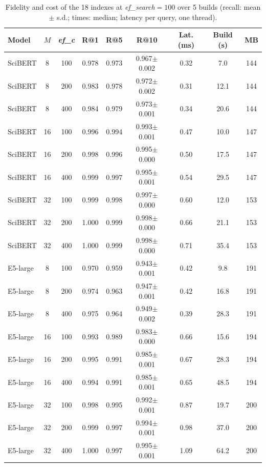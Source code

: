 \begin{table}[tbp]
\caption{Fidelity and cost of the 18 indexes at \textit{ef\_search}$=100$ over 5 builds (recall: mean $\pm$ s.d.; times: median; latency per query, one thread).}\label{tab:configs}
\centering
\small
\begin{tabular}{|l|c|c|c|c|c|c|c|c|}
\hline
\textbf{Model} & \textbf{$M$} & \textbf{\textit{ef\_c}} & \textbf{R@1} & \textbf{R@5} & \textbf{R@10} & \textbf{Lat. (ms)} & \textbf{Build (s)} & \textbf{MB} \\
\hline
SciBERT & 8 & 100 & 0.978 & 0.973 & 0.967$\pm$0.002 & 0.32 & 7.0 & 144 \\
SciBERT & 8 & 200 & 0.983 & 0.978 & 0.972$\pm$0.002 & 0.31 & 12.1 & 144 \\
SciBERT & 8 & 400 & 0.984 & 0.979 & 0.973$\pm$0.001 & 0.34 & 20.6 & 144 \\
SciBERT & 16 & 100 & 0.996 & 0.994 & 0.993$\pm$0.001 & 0.47 & 10.0 & 147 \\
SciBERT & 16 & 200 & 0.998 & 0.996 & 0.995$\pm$0.000 & 0.50 & 17.5 & 147 \\
SciBERT & 16 & 400 & 0.999 & 0.997 & 0.995$\pm$0.001 & 0.54 & 29.5 & 147 \\
SciBERT & 32 & 100 & 0.999 & 0.998 & 0.997$\pm$0.000 & 0.60 & 12.0 & 153 \\
SciBERT & 32 & 200 & 1.000 & 0.999 & 0.998$\pm$0.000 & 0.66 & 21.1 & 153 \\
SciBERT & 32 & 400 & 1.000 & 0.999 & 0.998$\pm$0.000 & 0.71 & 35.4 & 153 \\
E5-large & 8 & 100 & 0.970 & 0.959 & 0.943$\pm$0.001 & 0.42 & 9.8 & 191 \\
E5-large & 8 & 200 & 0.974 & 0.963 & 0.947$\pm$0.001 & 0.42 & 16.8 & 191 \\
E5-large & 8 & 400 & 0.975 & 0.964 & 0.949$\pm$0.002 & 0.39 & 28.3 & 191 \\
E5-large & 16 & 100 & 0.993 & 0.989 & 0.983$\pm$0.000 & 0.66 & 15.6 & 194 \\
E5-large & 16 & 200 & 0.995 & 0.991 & 0.985$\pm$0.001 & 0.67 & 28.3 & 194 \\
E5-large & 16 & 400 & 0.994 & 0.991 & 0.985$\pm$0.001 & 0.65 & 48.5 & 194 \\
E5-large & 32 & 100 & 0.998 & 0.995 & 0.992$\pm$0.001 & 0.87 & 19.7 & 200 \\
E5-large & 32 & 200 & 0.999 & 0.997 & 0.994$\pm$0.001 & 0.98 & 37.0 & 200 \\
E5-large & 32 & 400 & 1.000 & 0.997 & 0.995$\pm$0.001 & 1.09 & 64.2 & 200 \\
\hline
\end{tabular}
\end{table}